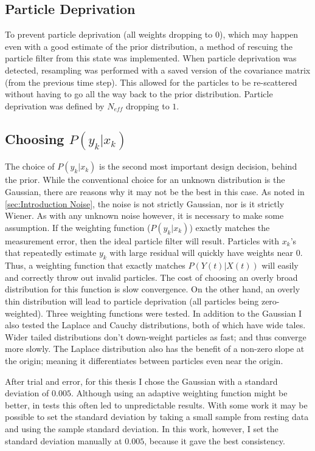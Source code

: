 \subsection{Particle Deprivation}
\label{sec:Particle Deprivation}
To prevent particle deprivation (all weights dropping to 0), which may happen even with a good
estimate of the prior distribution, a method of rescuing the particle
filter from this state was implemented. When particle deprivation was detected,
resampling was performed with a saved version of the covariance matrix (from
the previous time step). This allowed for the particles to be re-scattered
without having to go all the way back to the prior distribution. Particle
deprivation was defined by $N_{eff}$ dropping to $1$.

\subsection{Choosing $P(y_k | x_k)$}
\label{sec:Methods Weighting Function}
The choice of $P(y_k | x_k)$ is the second most important design decision, behind
the prior. While the conventional choice for an unknown distribution is the
Gaussian, there are reasons why it may not be the best in this case.
As noted in \autoref{sec:Introduction Noise}, the noise is not strictly Gaussian,
nor is it strictly Wiener. As with any unknown noise however, it is necessary
to make some assumption. If the weighting function ($P(y_k | x_k)$) exactly
matches the measurement error, then the ideal particle filter will result.
Particles with $x_k$'s that repeatedly estimate $y_k$ with large residual
will quickly have weights near 0. Thus, a weighting function that
exactly matches $P(Y(t) | X(t))$ will easily and correctly throw out invalid
particles.  The cost of choosing an overly broad distribution for this
function is slow convergence.  On the other hand, an overly thin
distribution will lead to particle deprivation (all particles
being zero-weighted). Three weighting functions were
tested. In addition to the Gaussian I also tested the Laplace and Cauchy
distributions, both of which have wide tales.
Wider tailed distributions don't down-weight
particles as fast; and thus converge more slowly.
The Laplace distribution also has the
benefit of a non-zero slope at the origin; meaning it
differentiates between particles even near the origin.

After trial and error, for this thesis I chose the Gaussian with a standard deviation
of $0.005$. Although using an adaptive weighting function
might be better, in tests this often led to unpredictable results.
With some work it may be possible to set the standard deviation by
taking a small sample from resting data and using the sample standard deviation.
In this work, however, I set the standard deviation manually at $0.005$,
because it gave the best consistency.

